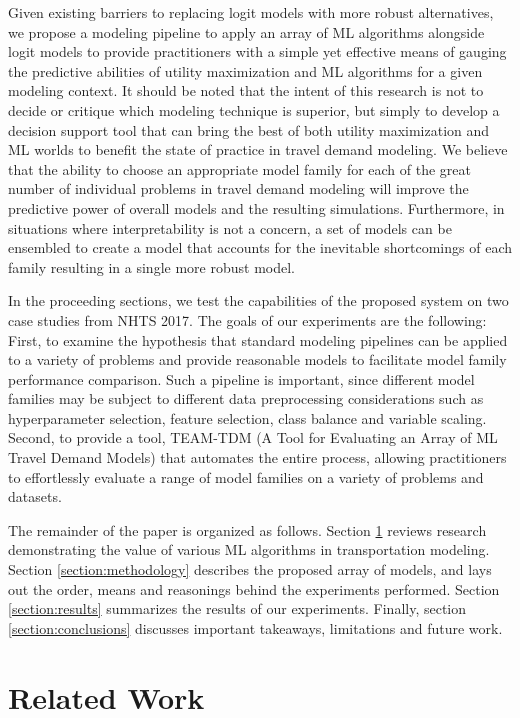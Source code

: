 \documentclass[numbered]{trbunofficial}
\begin{document}
Given existing barriers to replacing logit models with more robust alternatives, we propose a modeling pipeline to apply an array of ML algorithms alongside logit models to provide practitioners with a simple yet effective means of gauging the predictive abilities of utility maximization and ML algorithms for a given modeling context.
 It should be noted that the intent of this research is not to decide or critique which modeling technique is superior, but simply to develop a decision support tool that can bring the best of both utility maximization and ML worlds to benefit the state of practice in travel demand modeling.
 We believe that the ability to choose an appropriate model family for each of the great number of individual problems in travel demand modeling will improve the predictive power of overall models and the resulting simulations.
 Furthermore, in situations where interpretability is not a concern, a set of models can be ensembled to create a model that accounts for the inevitable shortcomings of each family resulting in a single more robust model.

In the proceeding sections, we test the capabilities of the proposed system on two case studies from NHTS 2017.
 The goals of our experiments are the following:
 First, to examine the hypothesis that standard modeling pipelines can be applied to a variety of problems and provide reasonable models to facilitate model family performance comparison.
 Such a pipeline is important, since different model families may be subject to different data preprocessing considerations such as hyperparameter selection, feature selection, class balance and variable scaling.
 Second, to provide a tool, TEAM-TDM (A Tool for Evaluating an Array of ML Travel Demand Models) that automates the entire process, allowing practitioners to effortlessly evaluate a range of model families on a variety of problems and datasets.
 
The remainder of the paper is organized as follows.
Section \ref{section:related_work} reviews research demonstrating the value of various ML algorithms in transportation modeling.
Section \ref{section:methodology} describes the proposed array of models, and lays out the order, means and reasonings behind the experiments performed.
Section \ref{section:results} summarizes the results of our experiments.
Finally, section \ref{section:conclusions} discusses important takeaways, limitations and future work.

\section{Related Work}\label{section:related_work}
\end{document}
